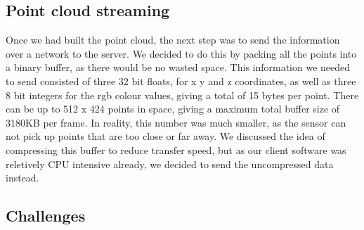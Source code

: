 \documentclass{article}
\begin{document}
\subsection{Point cloud streaming}
Once we had built the point cloud, the next step was to send the information over a network to the server. We decided to do this by packing all the points into a binary buffer, as there would be no wasted space. This information we needed to send consisted of three 32 bit floats, for x y and z coordinates, as well as three 8 bit integers for the rgb colour values, giving a total of 15 bytes per point. There can be up to 512 x 424 points in space, giving a maximum total buffer size of 3180KB per frame. In reality, this number was much smaller, as the sensor can not pick up points that are too close or far away. We discussed the idea of compressing this buffer to reduce transfer speed, but as our client software was reletively CPU intensive already, we decided to send the uncompressed data instead.
\newpage
\subsection{Challenges}
\end{document}
